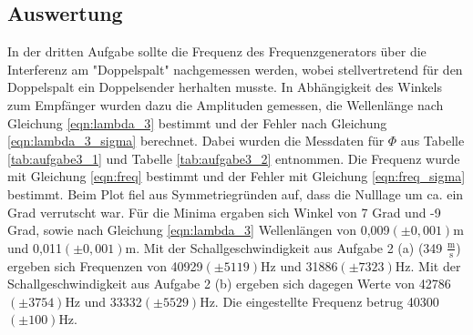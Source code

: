 \documentclass[12pt]{scrartcl}
\begin{document}
\subsection{Auswertung}
In der dritten Aufgabe sollte die Frequenz des Frequenzgenerators über die Interferenz am "Doppelspalt" nachgemessen werden, wobei stellvertretend für den Doppelspalt ein Doppelsender herhalten musste. In Abhängigkeit des Winkels zum Empfänger wurden dazu die Amplituden gemessen, die Wellenlänge nach Gleichung \ref{eqn:lambda_3} bestimmt und der Fehler nach Gleichung \ref{eqn:lambda_3_sigma} berechnet. Dabei wurden die Messdaten für $\Phi$ aus Tabelle \ref{tab:aufgabe3_1} und Tabelle \ref{tab:aufgabe3_2} entnommen. Die Frequenz wurde mit Gleichung \ref{eqn:freq} bestimmt und der Fehler mit Gleichung \ref{eqn:freq_sigma} bestimmt. Beim Plot fiel aus Symmetriegründen auf, dass die Nulllage um ca. ein Grad verrutscht war. Für die Minima ergaben sich Winkel von 7 Grad und -9 Grad, sowie nach Gleichung \ref{eqn:lambda_3} Wellenlängen von 0,009$(\pm 0,001)$m und 0,011$(\pm 0,001)$m. Mit der Schallgeschwindigkeit aus Aufgabe 2 (a) (349 $\frac{\text{m}}{\text{s}}$) ergeben sich Frequenzen von 40929$(\pm 5119)$Hz und 31886$(\pm 7323)$Hz. Mit der Schallgeschwindigkeit aus Aufgabe 2 (b) ergeben sich dagegen Werte von 42786$(\pm 3754)$Hz und 33332$(\pm 5529)$Hz. Die eingestellte Frequenz betrug 40300$(\pm100)$Hz.
\end{document}
